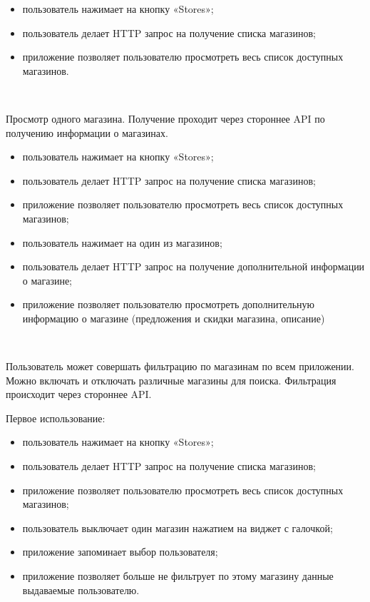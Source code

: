 \begin{itemize}
  \item пользователь нажимает на кнопку «Stores»;
  \item пользователь делает HTTP запрос на получение списка магазинов;
  \item приложение позволяет пользователю просмотреть весь список доступных магазинов.
\end{itemize}


~\par

Просмотр одного магазина. Получение проходит через стороннее API по получению информации о магазинах.

\begin{itemize}
  \item пользователь нажимает на кнопку «Stores»;
  \item пользователь делает HTTP запрос на получение списка магазинов;
  \item приложение позволяет пользователю просмотреть весь список доступных магазинов;
  \item пользователь нажимает на один из магазинов;
  \item пользователь делает HTTP запрос на получение дополнительной информации о магазине;
  \item приложение позволяет пользователю просмотреть дополнительную информацию о магазине (предложения и скидки магазина, описание)
\end{itemize}

~\par

Пользователь может совершать фильтрацию по магазинам по всем приложении. Можно включать и отключать различные магазины для поиска. Фильтрация происходит через стороннее API.

Первое использование:

\begin{itemize}
  \item пользователь нажимает на кнопку «Stores»;
  \item пользователь делает HTTP запрос на получение списка магазинов;
  \item приложение позволяет пользователю просмотреть весь список доступных магазинов;
  \item пользователь выключает один магазин нажатием на виджет с галочкой;
  \item приложение запоминает выбор пользователя;
  \item приложение позволяет больше не фильтрует по этому магазину данные выдаваемые пользователю.
\end{itemize}

